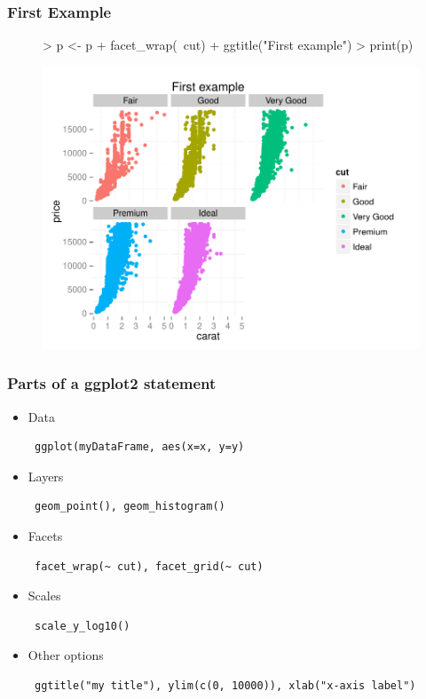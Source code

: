 \documentclass[10pt,slidestop,mathserif,c]{beamer}
\begin{document}
\begin{frame}
	\frametitle{First Example}
\begin{figure}
\begin{Schunk}
\begin{Sinput}
> p <- p + facet_wrap(~cut) + 
   	ggtitle("First example")
> print(p)
\end{Sinput}
\end{Schunk}
\includegraphics{Slides-ggplot-fig2}
\end{figure}
\end{frame}

\begin{frame}
	\frametitle{Parts of a ggplot2 statement}
	\begin{itemize}
		\item<+-| alert@+> Data \begin{verbatim} ggplot(myDataFrame, aes(x=x, y=y) \end{verbatim}
		\item<+-| alert@+> Layers \begin{verbatim} geom_point(), geom_histogram() \end{verbatim}
		\item<+-| alert@+> Facets \begin{verbatim} facet_wrap(~ cut), facet_grid(~ cut) \end{verbatim}
		\item<+-| alert@+> Scales \begin{verbatim} scale_y_log10() \end{verbatim}
		\item<+-| alert@+> Other options \begin{verbatim} ggtitle("my title"), ylim(c(0, 10000)), xlab("x-axis label") \end{verbatim}
	\end{itemize}
\end{frame}
\end{document}
